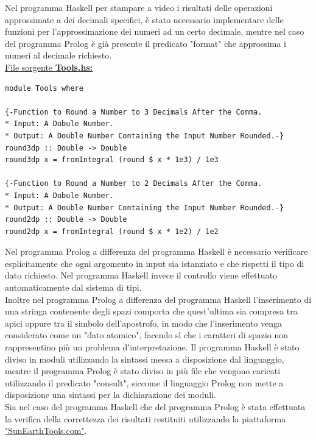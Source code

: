 \documentclass{article}
\begin{document}
Nel programma Haskell per stampare a video i risultati delle operazioni approssimate a dei decimali specifici, è stato necessario implementare delle funzioni per l'approssimazione dei numeri ad un certo decimale, mentre nel caso del programma Prolog è già presente il predicato "format" che approssima i numeri al decimale richiesto.\\
\bigskip
\underline{File sorgente \textbf{Tools.hs:}}
\lstset{language=Haskell}
\begin{lstlisting}
module Tools where

{-Function to Round a Number to 3 Decimals After the Comma.
* Input: A Dobule Number.
* Output: A Double Number Containing the Input Number Rounded.-}
round3dp :: Double -> Double
round3dp x = fromIntegral (round $ x * 1e3) / 1e3

{-Function to Round a Number to 2 Decimals After the Comma.
* Input: A Dobule Number.
* Output: A Double Number Containing the Input Number Rounded.-}
round2dp :: Double -> Double
round2dp x = fromIntegral (round $ x * 1e2) / 1e2
\end{lstlisting}

Nel programma Prolog a differenza del programma Haskell è necessario verificare esplicitamente che ogni argomento in input sia istanziato e che rispetti il tipo di dato richiesto. Nel programma Haskell invece il controllo viene effettuato automaticamente dal sistema di tipi.\\
Inoltre nel programma Prolog a differenza del programma Haskell l'inserimento di una stringa contenente degli spazi comporta che quest'ultima sia compresa tra apici oppure tra il simbolo dell'apostrofo, in modo che l'inserimento venga considerato come un "dato atomico",  facendo sì che i caratteri di spazio non rappresentino più un problema d'interpretazione.
Il programma Haskell è stato diviso in moduli utilizzando la sintassi messa a disposizione dal linguaggio, mentre il programma Prolog è stato diviso in più file che vengono caricati utilizzando il predicato "consult", siccome il linguaggio Prolog non mette a disposizione una sintassi per la dichiarazione dei moduli.\\
Sia nel caso del programma Haskell che del programma Prolog è stata effettuata la verifica della correttezza dei risultati restituiti utilizzando la piattaforma \href{https://www.sunearthtools.com/it/tools/distance.php}{"SunEarthTools.com"}.
\end{document}
